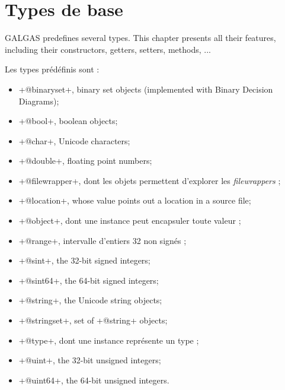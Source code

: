 
\chapter{Types de base}\label{predefinedTypes}

GALGAS predefines several types. This chapter presents all their features, including their constructors, getters, setters, methods, ...


Les types prédéfinis sont :
\begin{itemize}
\item \ggs+@binaryset+, binary set objects (implemented with Binary Decision Diagrams);
\item \ggs+@bool+, boolean objects;
\item \ggs+@char+, Unicode characters;
\item \ggs+@double+, floating point numbers;
\item \ggs+@filewrapper+, dont les objets permettent d'explorer les \emph{filewrappers} ;
\item \ggs+@location+, whose value points out a location in a source file;
\item \ggs+@object+, dont une instance peut encapsuler toute valeur ;
\item \ggs+@range+, intervalle d'entiers 32 non signés ;
\item \ggs+@sint+, the 32-bit signed integers;
\item \ggs+@sint64+, the 64-bit signed integers;
\item \ggs+@string+, the Unicode string objects;
\item \ggs+@stringset+, set of \ggs+@string+ objects;
\item \ggs+@type+, dont une instance représente un type ;
\item \ggs+@uint+, the 32-bit unsigned integers;
\item \ggs+@uint64+, the 64-bit unsigned integers.
\end{itemize}

